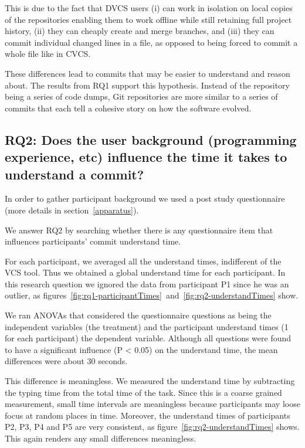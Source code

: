 \documentclass[letterpaper]{article}
\begin{document}
This is due to the fact that DVCS users (i) can work in isolation on local copies of the repositories enabling them to work offline while still retaining full project history, (ii) they can cheaply create and merge branches, and (iii) they can commit individual changed lines in a file, as opposed to being forced to commit a whole file like in CVCS.

These differences lead to commits that may be easier to understand and reason about.
The results from RQ1 support this hypothesis.
Instead of the repository being a series of code dumps, Git repositories are more similar to a series of commits that each tell a cohesive story on how the software evolved.

\subsection{RQ2: Does the user background (programming experience, etc) influence the time it takes to understand a commit?}

In order to gather participant background we used a post study questionnaire (more details in section~\ref{apparatus}).

We answer RQ2 by searching whether there is any questionnaire item that influences participants' commit understand time.

For each participant, we averaged all the understand times, indifferent of the VCS tool.
Thus we obtained a global understand time for each participant.
In this research question we ignored the data from participant P1 since he was an outlier, as figures~\ref{fig:rq1-participantTimes}~and~\ref{fig:rq2-understandTimes} show.

We ran ANOVAs that considered the questionnaire questions as being the independent variables (the treatment) and the participant understand times (1 for each participant) the dependent variable.
Although all questions were found to have a significant influence (P \textless{} 0.05) on the understand time, the mean differences were about 30 seconds.

This difference is meaningless.
We measured the understand time by subtracting the typing time from the total time of the task.
Since this is a coarse grained measurement, small time intervals are meaningless because participants may loose focus at random places in time.
Moreover, the understand times of participants P2, P3, P4 and P5 are very consistent, as figure~\ref{fig:rq2-understandTimes} shows. 
This again renders any small differences meaningless.
\end{document}
